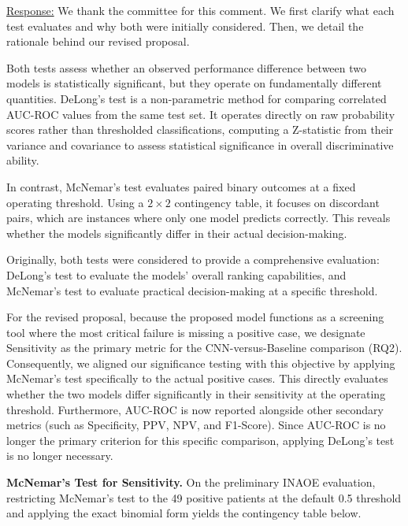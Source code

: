 \documentclass[12pt,a4paper]{article}
\newcommand{\mref}[1]{%
  \marginnote{%
    \color{respblue}\scriptsize
    \rule[-0.3ex]{0.6pt}{1.4ex}\hspace{4pt}%
    \parbox[t]{2.4cm}{\raggedright #1}%
  }%
}
\newenvironment{response}{%
  \par\color{respblue}%
}{\par}
\begin{document}
\mref{\S~3.7.2\\RQ2: Best CNN\\Model vs.\\Baseline Model}
\begin{response}
\underline{Response:} We thank the committee for this comment. We first clarify what each test evaluates and why both were initially considered. Then, we detail the rationale behind our revised proposal.

Both tests assess whether an observed performance difference between two models is statistically significant, but they operate on fundamentally different quantities. DeLong’s test is a non-parametric method for comparing correlated AUC-ROC values from the same test set. It operates directly on raw probability scores rather than thresholded classifications, computing a Z-statistic from their variance and covariance to assess statistical significance in overall discriminative ability.

In contrast, McNemar’s test evaluates paired binary outcomes at a fixed operating threshold. Using a $2 \times 2$ contingency table, it focuses on discordant pairs, which are instances where only one model predicts correctly. This reveals whether the models significantly differ in their actual decision-making.

Originally, both tests were considered to provide a comprehensive evaluation: DeLong’s test to evaluate the models' overall ranking capabilities, and McNemar’s test to evaluate practical decision-making at a specific threshold.

For the revised proposal, because the proposed model functions as a screening tool where the most critical failure is missing a positive case, we designate Sensitivity as the primary metric for the CNN-versus-Baseline comparison (RQ2). Consequently, we aligned our significance testing with this objective by applying McNemar’s test specifically to the actual positive cases. This directly evaluates whether the two models differ significantly in their sensitivity at the operating threshold. Furthermore, AUC-ROC is now reported alongside other secondary metrics (such as Specificity, PPV, NPV, and F1-Score). Since AUC-ROC is no longer the primary criterion for this specific comparison, applying DeLong’s test is no longer necessary.

\textbf{McNemar's Test for Sensitivity.} On the preliminary INAOE evaluation, restricting McNemar’s test to the 49 positive patients at the default 0.5 threshold and applying the exact binomial form yields the contingency table below.


\end{response}
\end{document}
